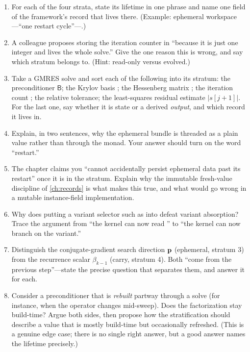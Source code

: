 \exercisessection
\begin{enumerate}[nosep]
  \item For each of the four strata, state its lifetime in one phrase and name one
  field of the framework's record that lives there. (Example: ephemeral
  workspace---``one restart cycle''---.)
  \item A colleague proposes storing the iteration counter  in
   ``because it is just one integer and lives the whole solve.''
  Give the one reason this is wrong, and say which stratum  belongs to.
  (Hint: read-only versus evolved.)
  \item Take a GMRES solve and sort each of the following into its stratum: the
  preconditioner $\mathsf{B}$; the Krylov basis ; the Hessenberg matrix
  ; the iteration count ; the relative tolerance; the
  least-squares residual estimate $|s[j{+}1]|$. For the last one, say whether it
  is state or a derived \emph{output}, and which record it lives in.
  \item Explain, in two sentences, why the ephemeral  bundle is
  threaded as a plain value rather than through the  monad. Your
  answer should turn on the word ``restart.''
  \item The chapter claims you ``cannot accidentally persist ephemeral data past
  its restart'' once it is in the  stratum. Explain why the immutable
  fresh-value discipline of \cref{ch:records} is what makes this true, and what
  would go wrong in a mutable instance-field implementation.
  \item Why does putting a variant selector such as  into
   defeat variant absorption? Trace the argument from ``the kernel
  can now read '' to ``the kernel can now branch on the variant.''
  \item Distinguish the conjugate-gradient search direction $\mathbf{p}$ (ephemeral,
  stratum 3) from the recurrence scalar $\beta_{k-1}$ (carry, stratum 4). Both
  ``come from the previous step''---state the precise question that separates
  them, and answer it for each.
  \item Consider a preconditioner that is \emph{rebuilt} partway through a solve
  (for instance, when the operator changes mid-sweep). Does the factorization
  stay build-time? Argue both sides, then propose how the stratification should
  describe a value that is mostly build-time but occasionally refreshed. (This is
  a genuine edge case; there is no single right answer, but a good answer names
  the lifetime precisely.)
\end{enumerate}
